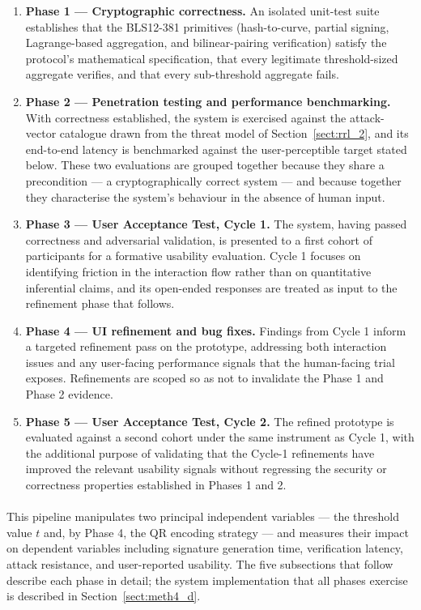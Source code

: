 \documentclass[a4paper]{scl-article}
\begin{document}
\begin{enumerate}
    \item \textbf{Phase 1 --- Cryptographic correctness.} An isolated unit-test suite establishes that the BLS12-381 primitives (hash-to-curve, partial signing, Lagrange-based aggregation, and bilinear-pairing verification) satisfy the protocol's mathematical specification, that every legitimate threshold-sized aggregate verifies, and that every sub-threshold aggregate fails.
    \item \textbf{Phase 2 --- Penetration testing and performance benchmarking.} With correctness established, the system is exercised against the attack-vector catalogue drawn from the threat model of Section~\ref{sect:rrl_2}, and its end-to-end latency is benchmarked against the user-perceptible target stated below. These two evaluations are grouped together because they share a precondition --- a cryptographically correct system --- and because together they characterise the system's behaviour in the absence of human input.
    \item \textbf{Phase 3 --- User Acceptance Test, Cycle 1.} The system, having passed correctness and adversarial validation, is presented to a first cohort of participants for a formative usability evaluation. Cycle 1 focuses on identifying friction in the interaction flow rather than on quantitative inferential claims, and its open-ended responses are treated as input to the refinement phase that follows.
    \item \textbf{Phase 4 --- UI refinement and bug fixes.} Findings from Cycle 1 inform a targeted refinement pass on the prototype, addressing both interaction issues and any user-facing performance signals that the human-facing trial exposes. Refinements are scoped so as not to invalidate the Phase 1 and Phase 2 evidence.
    \item \textbf{Phase 5 --- User Acceptance Test, Cycle 2.} The refined prototype is evaluated against a second cohort under the same instrument as Cycle 1, with the additional purpose of validating that the Cycle-1 refinements have improved the relevant usability signals without regressing the security or correctness properties established in Phases 1 and 2.
\end{enumerate}

\paragraph{}This pipeline manipulates two principal independent variables --- the threshold value $t$ and, by Phase 4, the QR encoding strategy --- and measures their impact on dependent variables including signature generation time, verification latency, attack resistance, and user-reported usability. The five subsections that follow describe each phase in detail; the system implementation that all phases exercise is described in Section~\ref{sect:meth4_d}.
\end{document}
